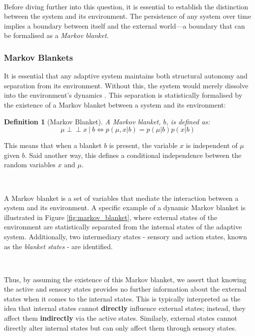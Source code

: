 \documentclass{article}
\newcommand{\indep}{\perp \!\!\! \perp}
\newtheorem{definition}{Definition}
\begin{document}
\

Before diving further into this question, it is essential to establish the distinction between the system and its environment. The persistence of any system over time implies a boundary between itself and the external world—a boundary that can be formalised as a \textit{Markov blanket}.

\subsubsection{Markov Blankets}

It is essential that any adaptive system maintains both structural autonomy and separation from its environment. Without this, the system would merely dissolve into the environment's dynamics \citep{parr2022ActiveInference}. This separation is statistically formalised by the existence of a Markov blanket \citep{pearl1988Probabilistic} between a system and its environment:

\begin{definition}[Markov Blanket]\label{def:markov_blanket}
A Markov blanket, $b$, is defined as:
$$ \mu \indep x \  | \ b \iff p(\mu, x | b) = p(\mu | b) p(x | b) $$
\end{definition}

This means that when a blanket $b$ is present, the variable $x$ is independent of $\mu$ given $b$. Said another way, this defines a conditional independence between the random variables $x$ and $\mu$.

\

A Markov blanket is a set of variables that mediate the interaction between a system and its environment. A specific example of a dynamic Markov blanket is illustrated in Figure \ref{fig:markov_blanket}, where external states of the environment are statistically separated from the internal states of the adaptive system. Additionally, two intermediary states - sensory and action states, known as the \textit{blanket states} - are identified. 

\

Thus, by assuming the existence of this Markov blanket, we assert that knowing the active and sensory states provides no further information about the external states when it comes to the internal states. This is typically interpreted as the idea that internal states cannot \textbf{directly} influence external states; instead, they affect them \textbf{indirectly} via the active states. Similarly, external states cannot directly alter internal states but can only affect them through sensory states.
\end{document}
